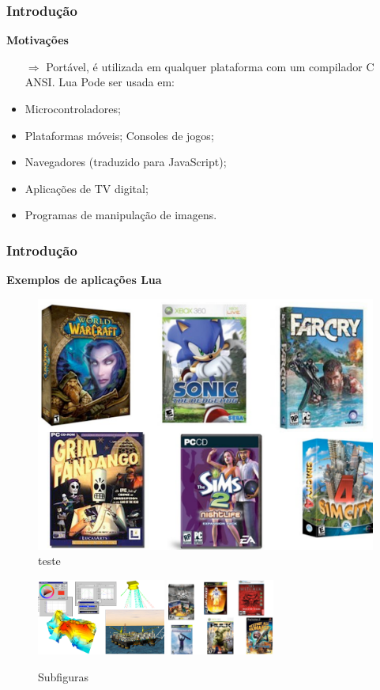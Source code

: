 \documentclass{beamer}
\begin{document}
\begin{frame}[fragile]
	\frametitle{Introdução}
	{\bf Motivações}\vspace{0.4cm}
	\begin{itemize}
		\item[$\Rightarrow$] Portável, é utilizada em qualquer plataforma com um compilador C ANSI. Lua Pode ser usada em:
		\pause
		\item Microcontroladores; 
		\item Plataformas móveis;
		Consoles de jogos;
		\item Navegadores (traduzido para JavaScript);
		\item Aplicações de TV digital;
		\item Programas de manipulação de imagens.
	\end{itemize}
\end{frame}

\begin{frame}[fragile]
	\frametitle{Introdução}
	{\bf Exemplos de aplicações Lua}\vspace{0.4cm}
		\begin{figure}[!htb]
		\centering
		\includegraphics[width=0.4\linewidth]{imagens/exemplo2}
		\caption{teste}
		\end{figure}

		\begin{figure}[!htb]
			\centering
			\includegraphics[height=2.5cm]{imagens/exemplo3}
			\label{figdroopy}
			\quad %
			\includegraphics[height=2.5cm]{imagens/exemplo1}
			\label{figsnoop}
			\caption{Subfiguras}
			\label{fig01}
		\end{figure}
\end{frame}
\end{document}
